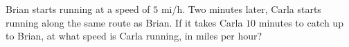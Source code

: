 Brian starts running at a speed of $5$ mi/h. Two minutes later, Carla starts running along the same route as Brian. If it takes Carla $10$ minutes to catch up to Brian, at what speed is Carla running, in miles per hour?

